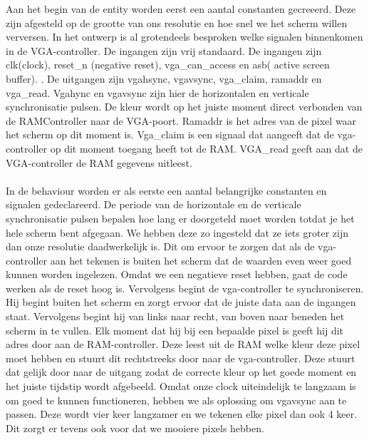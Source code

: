 \documentclass{scrartcl}  %
\begin{document}
Aan het begin van de entity worden eerst een aantal constanten gecreeerd. Deze zijn afgesteld op de grootte van ons resolutie en hoe snel we het scherm willen verversen. In het ontwerp is al grotendeels besproken welke signalen binnenkomen in de VGA-controller. De ingangen zijn vrij standaard. De ingangen zijn clk(clock), reset\_n (negative reset), vga\_can\_access en asb( active screen buffer). . De uitgangen zijn vgahsync, vgavsync, vga\_claim, ramaddr en vga\_read. Vgahync en vgavsync zijn hier de horizontalen en verticale synchronisatie pulsen. De kleur wordt op het juiste moment direct verbonden van de RAMController naar de VGA-poort. Ramaddr is het adres van de pixel waar het scherm op dit moment is. Vga\_claim is een signaal dat aangeeft dat de vga-controller op dit moment toegang heeft tot de RAM. VGA\_read geeft aan dat de VGA-controller de RAM gegevens uitleest.
\\\\
In de behaviour worden er als eerste  een aantal belangrijke constanten en signalen gedeclareerd. De periode van de horizontale en de verticale synchronisatie pulsen bepalen hoe lang er doorgeteld moet worden totdat je het hele scherm bent afgegaan. We hebben deze zo ingesteld dat ze iets groter zijn dan onze resolutie daadwerkelijk is. Dit om ervoor te zorgen dat als de vga-controller aan het tekenen is buiten het scherm dat de waarden even weer goed kunnen worden ingelezen. Omdat we een negatieve reset hebben, gaat de code werken als de reset hoog is. Vervolgens begint de vga-controller te synchroniseren. Hij begint buiten het scherm en zorgt ervoor dat de juiste data aan de ingangen staat. Vervolgens begint hij van links naar recht, van boven naar beneden het scherm in te vullen. Elk moment dat hij bij een bepaalde pixel is geeft hij dit adres door aan de RAM-controller. Deze leest uit de RAM welke kleur deze pixel moet hebben en stuurt dit rechtstreeks door naar de vga-controller. Deze stuurt dat gelijk door naar de uitgang zodat de correcte kleur op het goede moment en het juiste tijdstip wordt afgebeeld. Omdat onze clock uiteindelijk te langzaam is om goed te kunnen functioneren, hebben we als oplossing om vgavsync aan te passen. Deze wordt vier keer langzamer en we tekenen elke pixel dan ook 4 keer. Dit zorgt er tevens ook voor dat we mooiere pixels hebben. 
\end{document}
